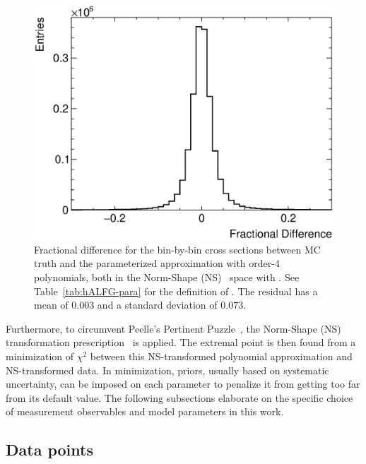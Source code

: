 \begin{figure}[!htb] 	
    \centering 		
    \includegraphics[width=\sgfigwid\textwidth]{figures/residual.eps}
    \caption{\label{fig:residual} Fractional difference for the bin-by-bin cross sections between MC truth and the parameterized approximation with order-4 polynomials,  both in the Norm-Shape (NS)~\cite{DAgostini:1993arp,Hanson:2005mrg} space with \allpar. See Table~\ref{tab:hALFG-para} for the definition of \allpar. The residual has a mean of $0.003$ and a standard deviation of $0.073$.} 
\end{figure}

Furthermore, to circumvent Peelle's Pertinent Puzzle~\cite{PPP_FNL,Chakrani:2023htw}, the Norm-Shape (NS) transformation prescription~\cite{DAgostini:1993arp,Hanson:2005mrg} is applied. The extremal point is then found from a minimization of $\chi^2$ between this NS-transformed polynomial approximation and NS-transformed data. In minimization, priors, usually based on systematic uncertainty, can be imposed on each parameter to penalize it from getting too far from its default value. The following subsections elaborate on the specific choice of measurement observables and model parameters in this work.

\subsection{\label{sec:tuning-obs-choice} Data points}


